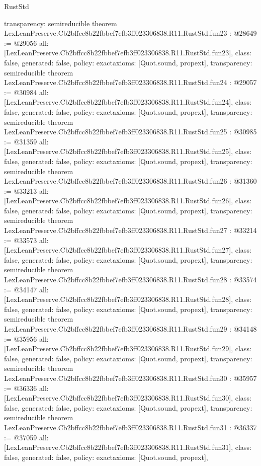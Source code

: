\begin{lexlean}{RustStd}
\begin{coremodule}
{  transparency: semireducible
}
theorem LexLeanPreserve.Cb2bffcc8b22fbbef7efb3ff023306838.R11.RustStd.fun23 : @28649 := @29056 {
  all: [LexLeanPreserve.Cb2bffcc8b22fbbef7efb3ff023306838.R11.RustStd.fun23],
  class: false,
  generated: false,
  policy: exact{axioms: [Quot.sound, propext]},
  transparency: semireducible
}
theorem LexLeanPreserve.Cb2bffcc8b22fbbef7efb3ff023306838.R11.RustStd.fun24 : @29057 := @30984 {
  all: [LexLeanPreserve.Cb2bffcc8b22fbbef7efb3ff023306838.R11.RustStd.fun24],
  class: false,
  generated: false,
  policy: exact{axioms: [Quot.sound, propext]},
  transparency: semireducible
}
theorem LexLeanPreserve.Cb2bffcc8b22fbbef7efb3ff023306838.R11.RustStd.fun25 : @30985 := @31359 {
  all: [LexLeanPreserve.Cb2bffcc8b22fbbef7efb3ff023306838.R11.RustStd.fun25],
  class: false,
  generated: false,
  policy: exact{axioms: [Quot.sound, propext]},
  transparency: semireducible
}
theorem LexLeanPreserve.Cb2bffcc8b22fbbef7efb3ff023306838.R11.RustStd.fun26 : @31360 := @33213 {
  all: [LexLeanPreserve.Cb2bffcc8b22fbbef7efb3ff023306838.R11.RustStd.fun26],
  class: false,
  generated: false,
  policy: exact{axioms: [Quot.sound, propext]},
  transparency: semireducible
}
theorem LexLeanPreserve.Cb2bffcc8b22fbbef7efb3ff023306838.R11.RustStd.fun27 : @33214 := @33573 {
  all: [LexLeanPreserve.Cb2bffcc8b22fbbef7efb3ff023306838.R11.RustStd.fun27],
  class: false,
  generated: false,
  policy: exact{axioms: [Quot.sound, propext]},
  transparency: semireducible
}
theorem LexLeanPreserve.Cb2bffcc8b22fbbef7efb3ff023306838.R11.RustStd.fun28 : @33574 := @34147 {
  all: [LexLeanPreserve.Cb2bffcc8b22fbbef7efb3ff023306838.R11.RustStd.fun28],
  class: false,
  generated: false,
  policy: exact{axioms: [Quot.sound, propext]},
  transparency: semireducible
}
theorem LexLeanPreserve.Cb2bffcc8b22fbbef7efb3ff023306838.R11.RustStd.fun29 : @34148 := @35956 {
  all: [LexLeanPreserve.Cb2bffcc8b22fbbef7efb3ff023306838.R11.RustStd.fun29],
  class: false,
  generated: false,
  policy: exact{axioms: [Quot.sound, propext]},
  transparency: semireducible
}
theorem LexLeanPreserve.Cb2bffcc8b22fbbef7efb3ff023306838.R11.RustStd.fun30 : @35957 := @36336 {
  all: [LexLeanPreserve.Cb2bffcc8b22fbbef7efb3ff023306838.R11.RustStd.fun30],
  class: false,
  generated: false,
  policy: exact{axioms: [Quot.sound, propext]},
  transparency: semireducible
}
theorem LexLeanPreserve.Cb2bffcc8b22fbbef7efb3ff023306838.R11.RustStd.fun31 : @36337 := @37059 {
  all: [LexLeanPreserve.Cb2bffcc8b22fbbef7efb3ff023306838.R11.RustStd.fun31],
  class: false,
  generated: false,
  policy: exact{axioms: [Quot.sound, propext]},
}
\end{coremodule}
\end{lexlean}
